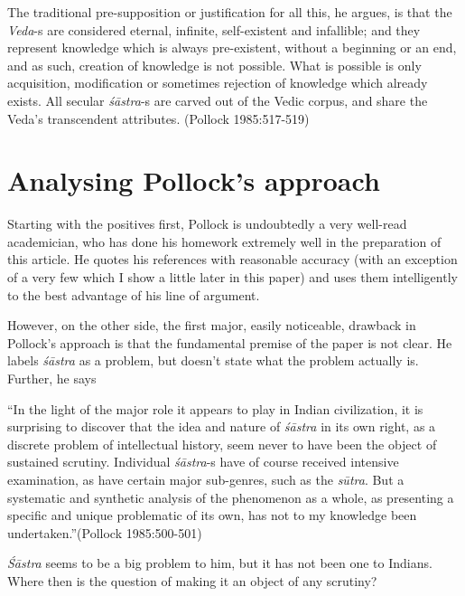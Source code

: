 The traditional pre-supposition or justification for all this, he argues, is that the {\it Veda}-s are considered eternal, infinite, self-existent and infallible; and they represent knowledge which is always pre-existent, without a beginning or an end, and as such, creation of knowledge is not possible. What is possible is only acquisition, modification or sometimes rejection of knowledge which already exists. All secular {\it śāstra}-s are carved out of the Vedic corpus, and share the Veda's transcendent attributes. (Pollock 1985:517-519)

\section*{Analysing Pollock's approach}

Starting with the positives first, Pollock is undoubtedly a very well-read academician, who has done his homework extremely well in the preparation of this article. He quotes his references with reasonable accuracy (with an exception of a very few which I show a little later in this paper) and uses them intelligently to the best advantage of his line of argument. 

However, on the other side, the first major, easily noticeable, drawback in Pollock's approach is that the fundamental premise of the paper is not clear. He labels {\it śāstra} as a problem, but doesn't state what the problem actually is. Further, he says
\begin{myquote}
``In the light of the major role it appears to play in Indian civilization, it is surprising to discover that the idea and nature of {\sl śāstra} in its own right, as a discrete problem of intellectual history, seem never to have been the object of sustained scrutiny. Individual {\sl śāstra}-s have of course received intensive examination, as have certain major sub-genres, such as the {\sl sūtra}. But a systematic and synthetic analysis of the phenomenon as a whole, as presenting a specific and unique problematic of its own, has not to my knowledge been undertaken.''\hfill (Pollock 1985:500-501)
\end{myquote}

{\sl Śāstra} seems to be a big problem to him, but it has not been one to Indians. Where then is the question of making it an object of any scrutiny? 

